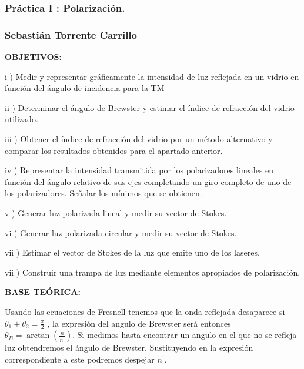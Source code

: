 \documentclass[12pt,thmsa]{article}
\begin{document}
\subsubsection{\protect\vspace{1pt}Pr\'{a}ctica I : Polarizaci\'{o}n.}

\subsubsection{Sebasti\'{a}n Torrente Carrillo}

\vspace{1pt}

\textbf{OBJETIVOS:}

i ) Medir y representar gr\'{a}ficamente la intensidad de luz reflejada en
un vidrio en funci\'{o}n del \'{a}ngulo de incidencia para la TM

ii ) Determinar el \'{a}ngulo de Brewster y estimar el \'{i}ndice de
refracci\'{o}n del vidrio utilizado.

iii ) Obtener el \'{i}ndice de refracci\'{o}n del vidrio por un m\'{e}todo
alternativo y comparar los resultados obtenidos para el apartado anterior.

iv ) Representar la intensidad transmitida por los polarizadores lineales en
funci\'{o}n del \'{a}ngulo relativo de sus ejes completando un giro completo
de uno de los polarizadores. Se\~{n}alar los m\'{i}nimos que se obtienen.

v ) Generar luz polarizada lineal y medir su vector de Stokes.

vi ) Generar luz polarizada circular y medir su vector de Stokes.

vii ) Estimar el vector de Stokes de la luz que emite uno de los laseres.

vii ) Construir una trampa de luz mediante elementos apropiados de
polarizaci\'{o}n.

\vspace{1pt}

\textbf{BASE TE\'{O}RICA:}

\vspace{1pt}

Usando las ecuaciones de Fresnell tenemos que la onda reflejada desaparece
si $\theta _{1}+\theta _{2}=\frac{\pi }{2}$ , la expresi\'{o}n del angulo de
Brewster ser\'{a} entonces $\theta _{B}=\arctan (\frac{n}{n^{\prime }})$. Si
medimos hasta encontrar un angulo en el que no se refleja luz obtendremos el
\'{a}ngulo de Brewster. Sustituyendo en la expresi\'{o}n correspondiente a
este podremos despejar $n^{\prime }$.
\end{document}
